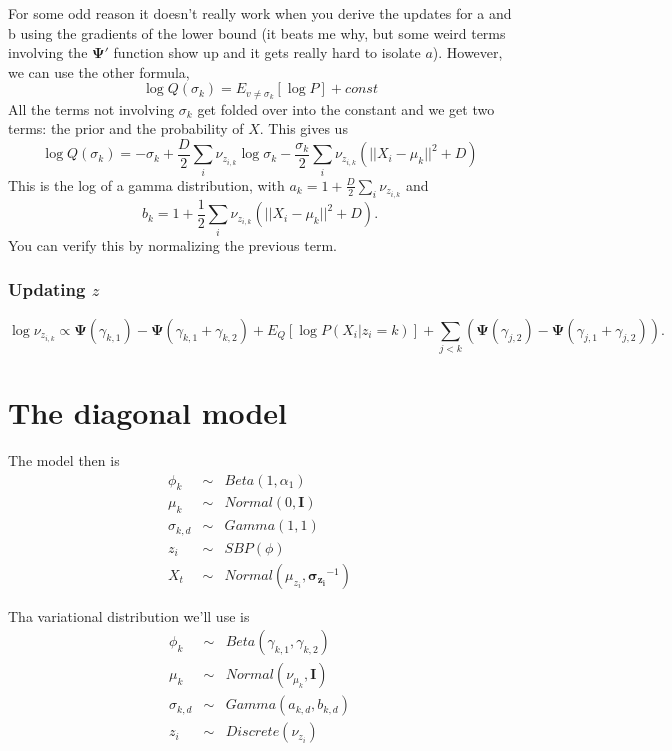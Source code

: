 \documentclass{article}
\newcommand{\digamma}{\bm{\Psi}}
\newcommand{\m}[1]{\nu_{#1}}
\begin{document}
For some odd reason it doesn't really work when you derive the updates
for a and b using the gradients of the lower bound (it beats me why,
but some weird terms involving the $\digamma'$ function show up and it
gets really hard to isolate $a$). However, we can use the other formula,
\[
\log Q(\sigma_k) = E_{v \ne \sigma_k}[\log P] + const
\]
All the terms not involving $\sigma_k$ get folded over into the
constant and we get two terms: the prior and the probability of
$X$. This gives us
\[
\log Q(\sigma_k) = -\sigma_k  + \frac{D}{2} \sum_i \m{z_{i,k}}\log \sigma_k  - \frac{\sigma_k}{2}\sum_i \m{z_{i,k}} (||X_i-\mu_k||^2 + D)
\]
This is the log of a gamma distribution, with $a_k = 1+
\frac{D}{2}\sum_i \m{z_{i,k}}$ and
\[
b_k = 1 + \frac{1}{2}\sum_i \m{z_{i,k}} (||X_i-\mu_k||^2 + D).
\]
You can verify this by normalizing the previous term.

\subsubsection{Updating $z$}
\label{sec:updating-z}

\[
\log \m{z_{i,k}} \propto \digamma(\gamma_{k,1}) -
\digamma(\gamma_{k,1} + \gamma_{k,2}) + E_Q[\log P(X_i|z_i=k)] +
\sum_{j < k} \left (\digamma(\gamma_{j,2}) -
  \digamma(\gamma_{j,1}+\gamma_{j,2})\right).
\]

\section{The diagonal model}
\label{sec:diagonal-model}

The model then is
\begin{eqnarray*}
  \phi_k   &\sim& Beta(1, \alpha_1) \\
  \mu_k   &\sim& Normal(0,  \mathbf{I}) \\
  \sigma_{k,d} &\sim& Gamma(1, 1) \\
  z_{i}     &\sim& SBP(\phi) \\
  X_t &\sim& Normal(\mu_{z_i}, \bm{\sigma_{z_i}}^{-1})
\end{eqnarray*}

Tha variational distribution we'll use is
\begin{eqnarray*}
  \phi_k   &\sim& Beta(\gamma_{k,1}, \gamma_{k,2}) \\
  \mu_k   &\sim& Normal(\m{\mu_k},  \mathbf{I}) \\
  \sigma_{k,d} &\sim& Gamma(a_{k,d}, b_{k,d}) \\
  z_{i}     &\sim& Discrete(\m{z_i}) \\
\end{eqnarray*}
\end{document}
